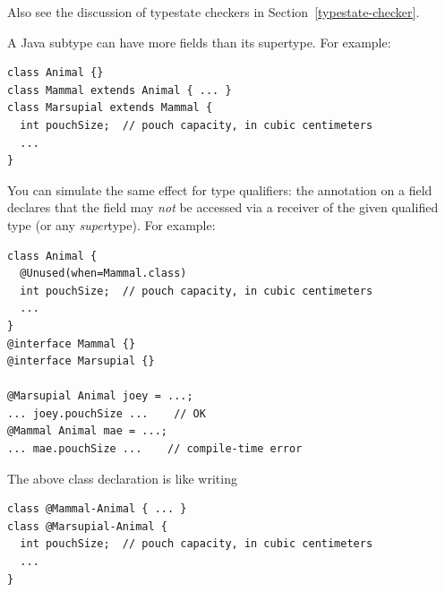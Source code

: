 


Also see the discussion of typestate checkers in
Section~\ref{typestate-checker}.



A Java subtype can have more fields than its supertype.  For example:

\begin{Verbatim}
class Animal {}
class Mammal extends Animal { ... }
class Marsupial extends Mammal {
  int pouchSize;  // pouch capacity, in cubic centimeters
  ...
}
\end{Verbatim}

You can simulate
the same effect for type qualifiers:
the  annotation
on a field declares that the field may \emph{not} be accessed via a receiver of
the given qualified type (or any \emph{super}type).
For example:

\begin{Verbatim}
class Animal {
  @Unused(when=Mammal.class)
  int pouchSize;  // pouch capacity, in cubic centimeters
  ...
}
@interface Mammal {}
@interface Marsupial {}

@Marsupial Animal joey = ...;
... joey.pouchSize ...    // OK
@Mammal Animal mae = ...;
... mae.pouchSize ...    // compile-time error
\end{Verbatim}

The above class declaration is like writing

\begin{Verbatim}
class @Mammal-Animal { ... }
class @Marsupial-Animal {
  int pouchSize;  // pouch capacity, in cubic centimeters
  ...
}
\end{Verbatim}


